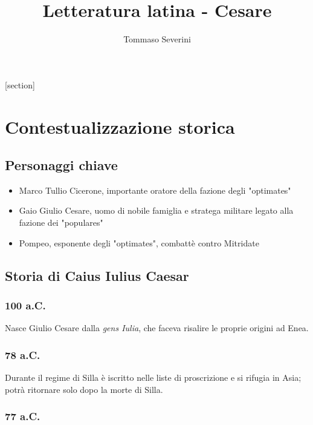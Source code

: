 \documentclass[10pt,a4paper]{article}
\author{Tommaso Severini}
\title{Letteratura latina - Cesare}
\begin{document}
	\maketitle

	[section]

	\section{Contestualizzazione storica}

	\subsection{Personaggi chiave}

	\begin{itemize}
		\item Marco Tullio Cicerone, importante oratore della fazione degli "optimates"
		\item Gaio Giulio Cesare, uomo di nobile famiglia e stratega militare legato alla fazione dei "populares"
		\item Pompeo, esponente degli "optimates", combattè contro Mitridate
	\end{itemize}

	\subsection{Storia di Caius Iulius Caesar}

	\subsubsection{100 a.C.}

	Nasce Giulio Cesare dalla \textit{gens Iulia}, che faceva risalire le proprie origini ad Enea.

	\subsubsection{78 a.C.}

	Durante il regime di Silla è iscritto nelle liste di proscrizione e si rifugia in Asia; potrà ritornare solo dopo la morte di Silla.

	\subsubsection{77 a.C.}
\end{document}
